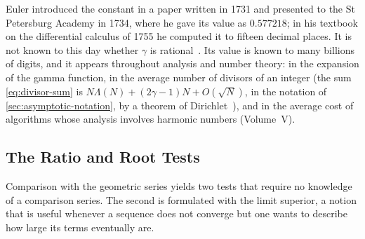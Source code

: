 \begin{table}
\end{table}

Euler introduced the constant in a paper written in 1731 and presented to the St Petersburg Academy in 1734, where he gave its value as $0.577218$; in his textbook on the differential calculus of 1755 he computed it to fifteen decimal places. It is not known to this day whether $\gamma$ is rational~\cite{lagarias2013gamma,havil2003gamma}. Its value is known to many billions of digits, and it appears throughout analysis and number theory: in the expansion of the gamma function, in the average number of divisors of an integer (the sum \eqref{eq:divisor-sum} is $N\Lambda(N)+(2\gamma-1)N+O(\sqrt N)$, in the notation of \cref{sec:asymptotic-notation}, by a theorem of Dirichlet~\cite{hardywright2008}), and in the average cost of algorithms whose analysis involves harmonic numbers (Volume~V).

\subsection{The Ratio and Root Tests}

Comparison with the geometric series yields two tests that require no knowledge of a comparison series. The second is formulated with the limit superior, a notion that is useful whenever a sequence does not converge but one wants to describe how large its terms eventually are.

